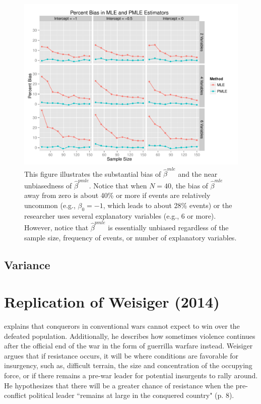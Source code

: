 \documentclass[12pt]{article}
\begin{document}
\begin{figure}[H]
\begin{center}
\includegraphics[width = \textwidth]{figs/sims-coef-perc-bias.pdf}
\caption{This figure illustrates the substantial bias of $\hat{\beta}^{mle}$ and the near unbiasedness of $\hat{\beta}^{pmle}$. Notice that when $N = 40$, the bias of $\hat{\beta}^{mle}$ away from zero is about 40\% or more if events are relatively uncommon (e.g., $\beta_0 = -1$, which leads to about 28\% events) or the researcher uses several explanatory variables (e.g., 6 or more). However, notice that $\hat{\beta}^{pmle}$ is essentially unbiased regardless of the sample size, frequency of events, or number of explanatory variables.}\label{fig:sims-coef-perc-bias}
\end{center}
\end{figure}

\subsection*{Variance}

\section*{Replication of Weisiger (2014)}

\citet{Weisiger2014} explains that conquerors in conventional wars cannot expect to win over the defeated population. Additionally, he describes how sometimes violence continues after the official end of the war in the form of guerrilla warfare instead. Weisiger argues that if resistance occurs, it will be where conditions are favorable for insurgency, such as, difficult terrain, the size and concentration of the occupying force, or if there remains a pre-war leader for potential insurgents to rally around. He hypothesizes that there will be a greater chance of resistance when the pre-conflict political leader ``remains at large in the conquered country" (p. 8).
\end{document}
